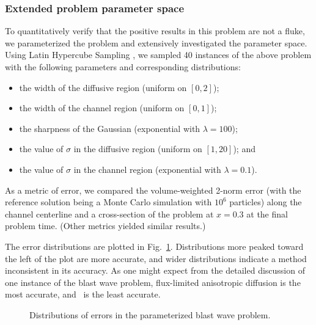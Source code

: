 \subsubsection{Extended problem parameter space}
To quantitatively verify that the positive results in this problem are not a
fluke, we parameterized the problem and extensively investigated the parameter
space.
Using Latin Hypercube Sampling \cite{Ima2008}, we sampled 40 instances of
the above problem with the following parameters and corresponding distributions:
\begin{itemize}
  \item the width of the diffusive region (uniform on $[0,2]$);
  \item the width of the channel region (uniform on $[0,1]$);
  \item the sharpness of the Gaussian (exponential with $\lambda = 100$);
  \item the value of $\sigma$ in the diffusive region (uniform on $[1,20]$); and
  \item the value of $\sigma$ in the channel region (exponential with
    $\lambda=0.1$).
\end{itemize}

As a metric of error, we compared the volume-weighted
2-norm error (with the reference solution being a Monte Carlo simulation
with $10^6$ particles) along the channel centerline and a cross-section of the
problem at $x=0.3$ at the final problem time. (Other metrics yielded similar
results.)

The error distributions are plotted in Fig.~\ref{fig:tdBlastwaveParameterized}.
Distributions more peaked toward the left of the plot are more accurate, and
wider distributions indicate a method inconsistent in its accuracy. As one might
expect from the detailed discussion of one instance of the blast wave problem,
flux-limited anisotropic diffusion is the most accurate, and \Pone\ is the least
accurate.

\begin{figure}[htb]
  \centering\small

  \caption{Distributions of errors in the parameterized blast wave problem.}
  \label{fig:tdBlastwaveParameterized}
\end{figure}

